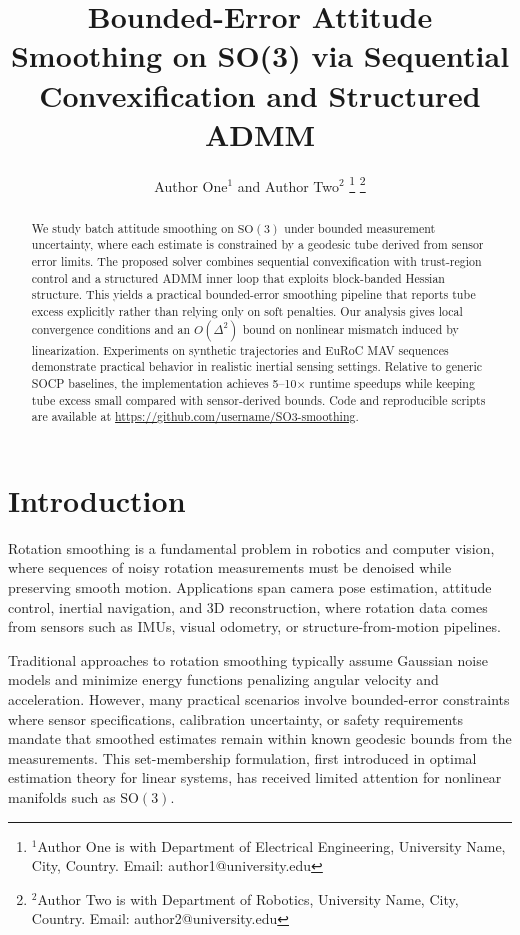 \documentclass[letterpaper, 10 pt, conference]{ieeeconf}
\title{\LARGE \bf
Bounded-Error Attitude Smoothing on SO(3) via Sequential Convexification and Structured ADMM
}
\author{Author One$^{1}$ and Author Two$^{2}$%
\thanks{$^{1}$Author One is with Department of Electrical Engineering, University Name, City, Country. Email: author1@university.edu}%
\thanks{$^{2}$Author Two is with Department of Robotics, University Name, City, Country. Email: author2@university.edu}%
}
\newcommand{\SO}{\mathrm{SO}(3)}
\begin{document}
\maketitle
\thispagestyle{empty}
\pagestyle{empty}

\begin{abstract}

We study batch attitude smoothing on $\SO$ under bounded measurement uncertainty, where each estimate is constrained by a geodesic tube derived from sensor error limits. The proposed solver combines sequential convexification with trust-region control and a structured ADMM inner loop that exploits block-banded Hessian structure. This yields a practical bounded-error smoothing pipeline that reports tube excess explicitly rather than relying only on soft penalties. Our analysis gives local convergence conditions and an $O(\Delta^2)$ bound on nonlinear mismatch induced by linearization. Experiments on synthetic trajectories and EuRoC MAV sequences demonstrate practical behavior in realistic inertial sensing settings. Relative to generic SOCP baselines, the implementation achieves 5--10$\times$ runtime speedups while keeping tube excess small compared with sensor-derived bounds. Code and reproducible scripts are available at \url{https://github.com/username/SO3-smoothing}.

\end{abstract}

\section{Introduction}
\label{sec:introduction}

Rotation smoothing is a fundamental problem in robotics and computer vision, where sequences of noisy rotation measurements must be denoised while preserving smooth motion. Applications span camera pose estimation, attitude control, inertial navigation, and 3D reconstruction, where rotation data comes from sensors such as IMUs, visual odometry, or structure-from-motion pipelines.

Traditional approaches to rotation smoothing typically assume Gaussian noise models and minimize energy functions penalizing angular velocity and acceleration. However, many practical scenarios involve bounded-error constraints where sensor specifications, calibration uncertainty, or safety requirements mandate that smoothed estimates remain within known geodesic bounds from the measurements. This set-membership formulation, first introduced in optimal estimation theory for linear systems, has received limited attention for nonlinear manifolds such as $\SO$.
\end{document}
